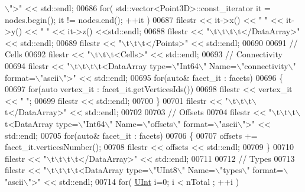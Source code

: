 \begin{DoxyCode}
{      \(\backslash\)">"} << std::endl;
00686     \textcolor{keywordflow}{for}( std::vector<Point3D>::const\_iterator it = nodes.begin(); it != nodes.end(); ++it )
00687         filestr << it->x() << \textcolor{stringliteral}{" "} << it->y() << \textcolor{stringliteral}{" "} << it->z() <<std::endl;
00688     filestr << \textcolor{stringliteral}{"\(\backslash\)t\(\backslash\)t\(\backslash\)t\(\backslash\)t</DataArray>"} << std::endl;
00689     filestr << \textcolor{stringliteral}{"\(\backslash\)t\(\backslash\)t\(\backslash\)t</Points>"} << std::endl;
00690 
00691     \textcolor{comment}{// Cells}
00692     filestr << \textcolor{stringliteral}{"\(\backslash\)t\(\backslash\)t\(\backslash\)t<Cells>"} << std::endl;
00693     \textcolor{comment}{//  Connectivity}
00694     filestr << \textcolor{stringliteral}{"\(\backslash\)t\(\backslash\)t\(\backslash\)t\(\backslash\)t<DataArray type=\(\backslash\)"Int64\(\backslash\)" Name=\(\backslash\)"connectivity\(\backslash\)" format=\(\backslash\)"ascii\(\backslash\)">"} << std::endl;
00695     \textcolor{keywordflow}{for}(\textcolor{keyword}{auto}& facet\_it : facets)
00696     \{
00697         \textcolor{keywordflow}{for}(\textcolor{keyword}{auto} vertex\_it : facet\_it.getVerticesIds())
00698             filestr << vertex\_it << \textcolor{stringliteral}{" "};
00699         filestr << std::endl;
00700     \}
00701     filestr << \textcolor{stringliteral}{"\(\backslash\)t\(\backslash\)t\(\backslash\)t\(\backslash\)t</DataArray>"} << std::endl;
00702 
00703     \textcolor{comment}{//  Offsets}
00704     filestr << \textcolor{stringliteral}{"\(\backslash\)t\(\backslash\)t\(\backslash\)t\(\backslash\)t<DataArray type=\(\backslash\)"Int64\(\backslash\)" Name=\(\backslash\)"offsets\(\backslash\)" format=\(\backslash\)"ascii\(\backslash\)">"} << std::endl;
00705     \textcolor{keywordflow}{for}(\textcolor{keyword}{auto}& facet\_it : facets)
00706     \{
00707         offsets += facet\_it.verticesNumber();
00708         filestr << offsets << std::endl;
00709     \}
00710     filestr << \textcolor{stringliteral}{"\(\backslash\)t\(\backslash\)t\(\backslash\)t\(\backslash\)t</DataArray>"} << std::endl;
00711 
00712     \textcolor{comment}{//  Types}
00713     filestr << \textcolor{stringliteral}{"\(\backslash\)t\(\backslash\)t\(\backslash\)t\(\backslash\)t<DataArray type=\(\backslash\)"UInt8\(\backslash\)" Name=\(\backslash\)"types\(\backslash\)" format=\(\backslash\)"ascii\(\backslash\)">"} << std::endl;
00714     \textcolor{keywordflow}{for}( \hyperlink{namespaceFVCode3D_a4bf7e328c75d0fd504050d040ebe9eda}{UInt} i=0; i < nTotal ; ++i )

\end{DoxyCode}

